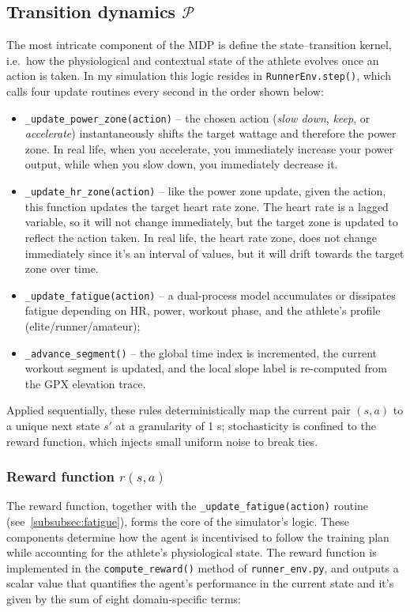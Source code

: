 \subsection{Transition dynamics \(\mathcal{P}\)}
The most intricate component of the MDP is define the state–transition kernel, i.e.\ how the physiological and contextual state of the athlete evolves once an action is taken. In my simulation this logic resides in \verb|RunnerEnv.step()|, which calls four update routines every second in the order shown below:

\begin{itemize}
  \item \verb|_update_power_zone(action)| – the chosen action (\emph{slow down}, \emph{keep}, or \emph{accelerate}) instantaneously shifts the target wattage and therefore the power zone. In real life, when you accelerate, you immediately increase your power output, while when you slow down, you immediately decrease it. 
  \item \verb|_update_hr_zone(action)| – like the power zone update, given the action, this function updates the target heart rate zone. The heart rate is a lagged variable, so it will not change immediately, but the target zone is updated to reflect the action taken. In real life, the heart rate zone, does not change immediately since it's an interval of values, but it will drift towards the target zone over time.
  \item \verb|_update_fatigue(action)| – a dual-process model accumulates or dissipates fatigue depending on HR, power, workout phase, and the athlete's profile (elite/runner/amateur);
  \item \verb|_advance_segment()| – the global time index is incremented, the current workout segment is updated, and the local slope label is re-computed from the GPX elevation trace.  
\end{itemize}

Applied sequentially, these rules deterministically map the current pair \((s,a)\) to a unique next state \(s'\) at a granularity of 1 s; stochasticity is confined to the reward function, which injects small uniform noise to break ties.

\subsubsection{Reward function \(r(s,a)\)}
The reward function, together with the \verb|_update_fatigue(action)| routine (see~\ref{subsubsec:fatigue}), forms the core of the simulator’s logic. These components determine how the agent is incentivised to follow the training plan while accounting for the athlete’s physiological state. The reward function is implemented in the \verb|compute_reward()| method of \verb|runner_env.py|, and outputs a scalar value that quantifies the agent’s performance in the current state and it's given by the sum of eight domain-specific terms:

